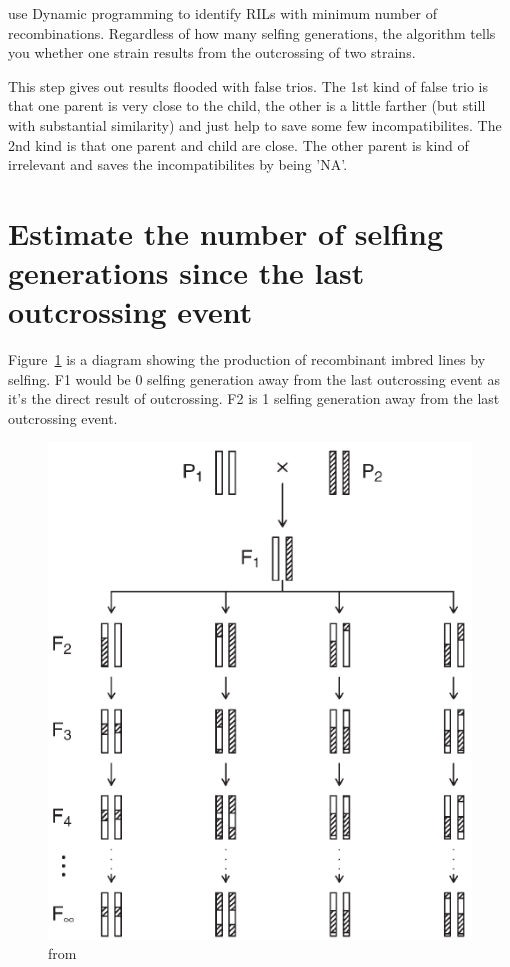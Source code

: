 \documentclass[a4paper,10pt]{article}
\begin{document}
use Dynamic programming to identify RILs with minimum number of recombinations. Regardless of how many selfing generations, the algorithm tells you whether one strain results from the outcrossing of two strains.

This step gives out results flooded with false trios. The 1st kind of false trio is that one parent is very close to the child, the other is a little farther (but still with substantial similarity) and just help to save some few incompatibilites. The 2nd kind is that one parent and child are close. The other parent is kind of irrelevant and saves the incompatibilites by being 'NA'.

\section{Estimate the number of selfing generations since the last outcrossing event}
Figure~\ref{f6} is a diagram showing the production of recombinant imbred lines by selfing. F1 would be 0 selfing generation away from the last outcrossing event as it's the direct result of outcrossing. F2 is 1 selfing generation away from the last outcrossing event.

\begin{figure}
\includegraphics[width=1\textwidth]{figures/selfing_diagram.png}
\caption{from \cite{Broman2005}}\label{f6}
\end{figure}
\end{document}
